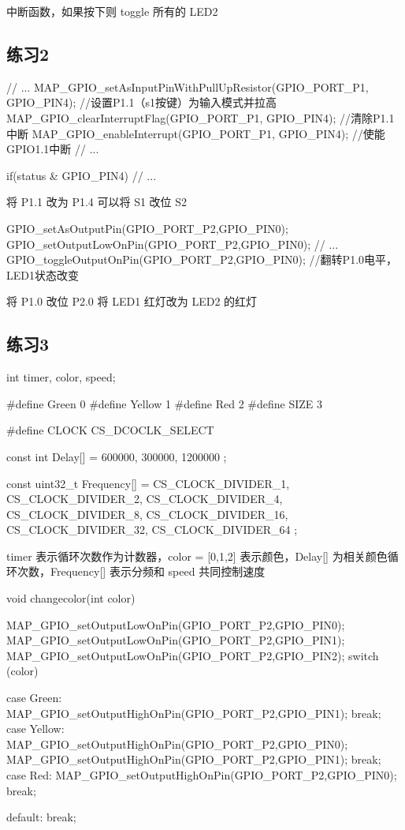 \documentclass[a4paper,10pt,UTF8]{paper}
\numberwithin{equation}{section}
\numberwithin{figure}{section}
\begin{document}
中断函数，如果按下则 toggle 所有的 LED2

\subsection{练习2}

\begin{ccode}
  // ...
  MAP_GPIO_setAsInputPinWithPullUpResistor(GPIO_PORT_P1, GPIO_PIN4); 
   //设置P1.1（s1按键）为输入模式并拉高
  MAP_GPIO_clearInterruptFlag(GPIO_PORT_P1, GPIO_PIN4);   //清除P1.1中断 
  MAP_GPIO_enableInterrupt(GPIO_PORT_P1, GPIO_PIN4);  //使能GPIO1.1中断
  // ...

  if(status & GPIO_PIN4)
  // ...
\end{ccode}

将 P1.1 改为 P1.4 可以将 S1 改位 S2

\begin{ccode}
  GPIO_setAsOutputPin(GPIO_PORT_P2,GPIO_PIN0);
  GPIO_setOutputLowOnPin(GPIO_PORT_P2,GPIO_PIN0);
  // ...
  GPIO_toggleOutputOnPin(GPIO_PORT_P2,GPIO_PIN0); 
  //翻转P1.0电平，LED1状态改变
\end{ccode}

将 P1.0 改位 P2.0 将 LED1 红灯改为 LED2 的红灯

\subsection{练习3}

\begin{ccode}
  int timer, color, speed;

  #define Green 0
  #define Yellow 1
  #define Red 2
  #define SIZE 3

  #define CLOCK CS_DCOCLK_SELECT

  const int Delay[] = {
    600000, 300000, 1200000
  };

  const uint32_t Frequency[] = {
    CS_CLOCK_DIVIDER_1,
    CS_CLOCK_DIVIDER_2,
    CS_CLOCK_DIVIDER_4,
    CS_CLOCK_DIVIDER_8,
    CS_CLOCK_DIVIDER_16,
    CS_CLOCK_DIVIDER_32,
    CS_CLOCK_DIVIDER_64
  };
\end{ccode}

timer 表示循环次数作为计数器，color = [0,1,2] 表示颜色，Delay[] 为相关颜色循环次数，Frequency[] 表示分频和 speed 共同控制速度

\begin{ccode}
  void changecolor(int color) {
    MAP_GPIO_setOutputLowOnPin(GPIO_PORT_P2,GPIO_PIN0);
    MAP_GPIO_setOutputLowOnPin(GPIO_PORT_P2,GPIO_PIN1);
    MAP_GPIO_setOutputLowOnPin(GPIO_PORT_P2,GPIO_PIN2);
    switch (color)
    {
    case Green:
      MAP_GPIO_setOutputHighOnPin(GPIO_PORT_P2,GPIO_PIN1);
      break;
    case Yellow:
      MAP_GPIO_setOutputHighOnPin(GPIO_PORT_P2,GPIO_PIN0);
      MAP_GPIO_setOutputHighOnPin(GPIO_PORT_P2,GPIO_PIN1);
      break;
    case Red:
      MAP_GPIO_setOutputHighOnPin(GPIO_PORT_P2,GPIO_PIN0);
      break;
    
    default:
      break;
    }
  }
\end{ccode}
\end{document}
